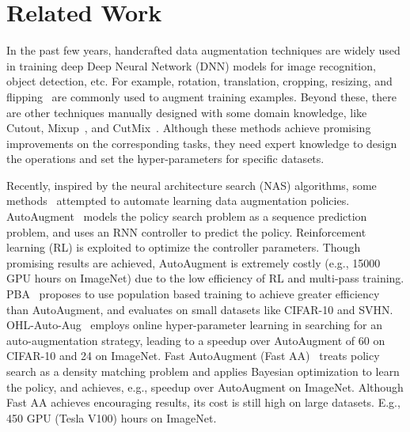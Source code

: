 \documentclass[runningheads]{llncs}
\begin{document}
 
\section{Related Work}
\label{sec:relatedwork}
In the past few years, handcrafted data augmentation techniques are widely used in training deep Deep Neural Network (DNN) models for image recognition, object detection, etc.
For example, rotation, translation, cropping, resizing, and flipping~\cite{lecun1998gradient, DBLP:journals/corr/SimonyanZ14a} are  commonly used to augment training examples.
Beyond these, there are other techniques manually designed with some domain knowledge, like Cutout\cite{DBLP:journals/corr/abs-1708-04552}, Mixup~\cite{DBLP:conf/iclr/ZhangCDL18}, and CutMix~\cite{Yun_2019_ICCV}.
Although these methods  achieve promising improvements on the corresponding tasks, they need expert knowledge to design the operations and set the hyper-parameters for specific datasets.






Recently, inspired by the neural architecture search (NAS) algorithms, some methods~\cite{DBLP:conf/cvpr/CubukZMVL19, DBLP:conf/icml/HoLCSA19, Lin_2019_ICCV, DBLP:conf/nips/LimKKKK19} attempted to automate learning data augmentation policies. AutoAugment~\cite{DBLP:conf/cvpr/CubukZMVL19} models the policy search problem as a sequence prediction problem, and uses an RNN  controller to predict the policy. Reinforcement learning (RL) is exploited to optimize the controller parameters. Though promising results are achieved, AutoAugment is extremely costly (e.g., 15000 GPU hours on ImageNet) due to the low efficiency of RL and multi-pass training. PBA~\cite{DBLP:conf/icml/HoLCSA19} proposes to use population based training to achieve greater efficiency than AutoAugment, and evaluates on  small datasets like CIFAR-10 and SVHN. OHL-Auto-Aug~\cite{Lin_2019_ICCV} employs online hyper-parameter learning in searching for an auto-augmentation strategy, leading to a speedup over AutoAugment of 60  on CIFAR-10 and 24  on ImageNet. Fast AutoAugment (Fast AA)~\cite{DBLP:conf/nips/LimKKKK19} treats policy search as a density matching problem and applies Bayesian optimization to learn the policy, and achieves, e.g.,  speedup over AutoAugment on ImageNet. Although Fast AA achieves encouraging results, its cost is still high on large datasets. E.g., 450 GPU (Tesla V100) hours on ImageNet. 
\end{document}
